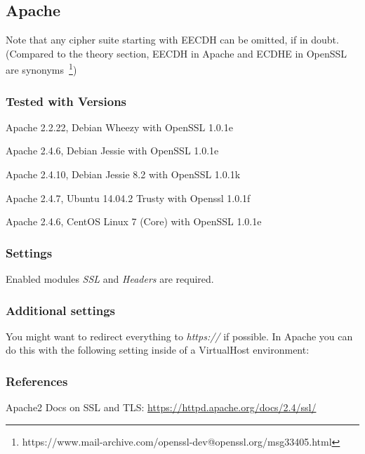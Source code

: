 \subsection{Apache}

Note that any cipher suite starting with EECDH can be omitted, if in doubt.
(Compared to the theory section, EECDH in Apache and ECDHE in OpenSSL are
synonyms~\footnote{https://www.mail-archive.com/openssl-dev@openssl.org/msg33405.html})

\subsubsection{Tested with Versions}
\begin{itemize*}
  \item Apache 2.2.22, Debian Wheezy with OpenSSL 1.0.1e
  \item Apache 2.4.6, Debian Jessie with OpenSSL 1.0.1e
	\item Apache 2.4.10, Debian Jessie 8.2 with OpenSSL 1.0.1k
  \item Apache 2.4.7, Ubuntu 14.04.2 Trusty with Openssl 1.0.1f
  \item Apache 2.4.6, CentOS Linux 7 (Core) with OpenSSL 1.0.1e
\end{itemize*}

\subsubsection{Settings}
Enabled modules \emph{SSL} and \emph{Headers} are required.


\subsubsection{Additional settings}
You might want to redirect everything to \emph{https://} if possible. In Apache
you can do this with the following setting inside of a VirtualHost environment:



\subsubsection{References}
\begin{itemize*}
  \item Apache2 Docs on SSL and TLS: \url{https://httpd.apache.org/docs/2.4/ssl/}
\end{itemize*}


